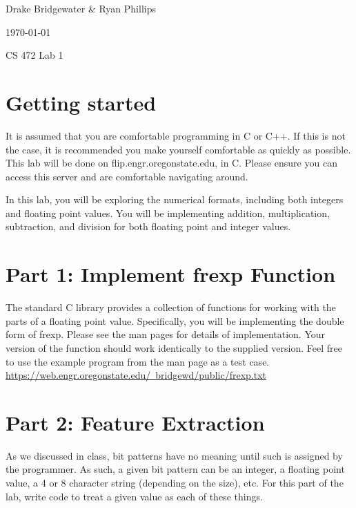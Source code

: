 \documentclass[letterpaper,12pt,titlepage]{article}
\def\name{Drake Bridgewater \& Ryan Phillips}
\begin{document}
\hfill \name

\hfill \today

\hfill CS 472 Lab 1
\section*{Getting started}
It is assumed that you are comfortable programming in C or C++. If this is not the case, it is recommended you make yourself comfortable as quickly as possible. This lab will be done on flip.engr.oregonstate.edu, in C. Please ensure you can access this server and are comfortable navigating around.

In this lab, you will be exploring the numerical formats, including both integers and floating point values. You will be implementing addition, multiplication, subtraction, and division for both floating point and integer values.

\section*{Part 1: Implement frexp Function}
The standard C library provides a collection of functions for working with the parts of a floating point value. Specifically, you will be implementing the double form of frexp. Please see the man pages for details of implementation. Your version of the function should work identically to the supplied version. Feel free to use the example program from the man page as a test case.  \hyperref[frexp]{https://web.engr.oregonstate.edu/~bridgewd/public/frexp.txt}




\newpage
\section*{Part 2: Feature Extraction}
As we discussed in class, bit patterns have no meaning until such is assigned by the programmer. As such, a given bit pattern can be an integer, a floating point value, a 4 or 8 character string (depending on the size), etc. For this part of the lab, write code to treat a given value as each of these things.
\end{document}

